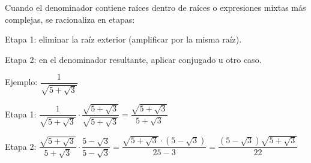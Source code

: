 \documentclass[11pt, letterpaper]{article}
\begin{document}
\begin{tcolorbox}[importantbox, title={Caso 5 — Denominador con raíz anidada o doble: racionalización en dos etapas}]
Cuando el denominador contiene raíces dentro de raíces o expresiones mixtas más complejas, se racionaliza en etapas:

Etapa 1: eliminar la raíz exterior (amplificar por la misma raíz).

Etapa 2: en el denominador resultante, aplicar conjugado u otro caso.

Ejemplo: $\dfrac{1}{\sqrt{5+\sqrt{3}}}$

Etapa 1: $\dfrac{1}{\sqrt{5+\sqrt{3}}}\cdot\dfrac{\sqrt{5+\sqrt{3}}}{\sqrt{5+\sqrt{3}}}=\dfrac{\sqrt{5+\sqrt{3}}}{5+\sqrt{3}}$

Etapa 2: $\dfrac{\sqrt{5+\sqrt{3}}}{5+\sqrt{3}}\cdot\dfrac{5-\sqrt{3}}{5-\sqrt{3}}=\dfrac{\sqrt{5+\sqrt{3}}\cdot(5-\sqrt{3})}{25-3}=\dfrac{(5-\sqrt{3})\sqrt{5+\sqrt{3}}}{22}$
\end{tcolorbox}
\end{document}
